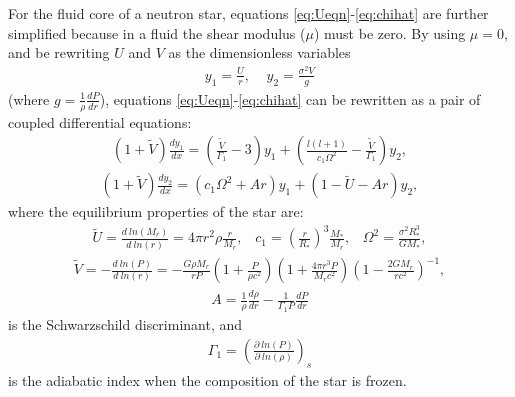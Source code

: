 \documentclass[fleqn,usenatbib]{mnras}
\begin{document}
\hspace{\parindent}For the fluid core of a neutron star, equations \ref{eq:Ueqn}-\ref{eq:chihat} are further simplified because in a fluid the shear modulus ($\mu$) must be zero. By using $\mu=0$, and be rewriting $U$ and $V$ as the dimensionless variables
\begin{align}
y_1=\frac{U}{r},\;\;\;\;y_2=\frac{\sigma^2V}{g}
\label{eq:y1y2}
\end{align}
\noindent (where $g=\frac{1}{\rho}\frac{dP}{dr}$), equations \ref{eq:Ueqn}-\ref{eq:chihat} can be rewritten as a pair of coupled differential equations:
\begin{align}
\left(1+\tilde{V}\right)\frac{dy_1}{dx}=\left(\frac{\tilde{V}}{\Gamma_1}-3\right)y_1+\left(\frac{l(l+1)}{c_1\Omega^2}-\frac{\tilde{V}}{\Gamma_1}\right)y_2,
\label{eq:McDy1}
\end{align}
\begin{align}
\left(1+\tilde{V}\right)\frac{dy_2}{dx}=\left(c_1\Omega^2+Ar\right)y_1+\left(1-\tilde{U}-Ar\right)y_2,
\label{eq:McDy2}
\end{align}
\noindent where the equilibrium properties of the star are: 
\begin{align}\nonumber
\tilde{U}=\frac{d\:ln\left(M_r\right)}{d\:ln\left(r\right)}=4\pi r^2\rho\frac{r}{M_r},\;\;\;c_1=\left(\frac{r}{R_*}\right)^3\frac{M_*}{M_r},\;\;\;\Omega^2=\frac{\sigma^2R_*^3}{GM_*},
\label{eq:eqbm_properties1}
\end{align}
\begin{align}\nonumber
\tilde{V}=-\frac{d\:ln\left(P\right)}{d\:ln\left(r\right)}=-\frac{G\rho M_r}{rP}\left(1+\frac{P}{\rho c^2}\right)\left(1+\frac{4\pi r^3 P}{M_r c^2}\right)\left(1-\frac{2GM_r}{rc^2}\right)^{-1},
\label{eq:eqbm_properties2}
\end{align}
\begin{align}
A=\frac{1}{\rho}\frac{d\rho}{dr}-\frac{1}{\Gamma_1P}\frac{dP}{dr}
\label{eq:schwartz_descrim}
\end{align}
\noindent is the Schwarzschild discriminant, and
\begin{align}
\Gamma_1=\left(\frac{\partial\:ln(P)}{\partial\:ln(\rho)}\right)_s
\label{eq:adiabatic_index}
\end{align}
\noindent is the adiabatic index when the composition of the star is frozen.
\end{document}
